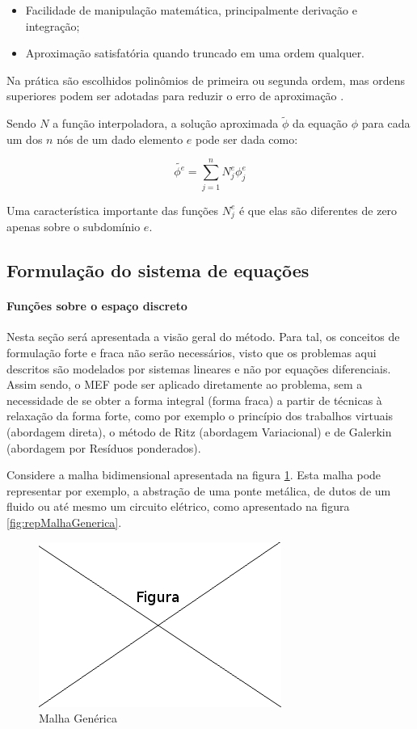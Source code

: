 \begin{itemize}  
\item Facilidade de manipulação matemática, principalmente derivação e integração;
\item Aproximação satisfatória quando truncado em uma ordem qualquer.
\end{itemize}

Na prática são escolhidos polinômios de primeira ou segunda ordem, mas ordens superiores podem ser adotadas para reduzir o erro de aproximação \citep[p. 32]{jin}.

Sendo $N$ a função interpoladora, a solução aproximada $\tilde{\phi}$ da equação $\phi$ para cada um dos $n$ nós de um dado elemento $e$ pode ser dada como:

 \begin{equation}
 	\label{eq:interpol}
		\tilde{\phi^e} = \sum_{j=1}^{n}{N_j^e \phi_j^e}
 \end{equation}

Uma característica importante das funções $N_j^e$ é que elas são diferentes de zero apenas sobre o subdomínio $e$.


\subsection{Formulação do sistema de equações}

\paragraph{Funções sobre o espaço discreto \\}

Nesta seção será apresentada a visão geral do método. Para tal, os conceitos de formulação forte e fraca não serão necessários, visto que os problemas aqui descritos são modelados por sistemas lineares e não por equações diferenciais. Assim sendo, o MEF pode ser aplicado diretamente ao problema, sem a necessidade de se obter a forma integral (forma fraca) a partir de técnicas à relaxação da forma forte, como por exemplo o princípio dos trabalhos virtuais (abordagem direta), o método de Ritz (abordagem Variacional) e de Galerkin (abordagem por Resíduos ponderados).

Considere a malha bidimensional  apresentada na figura \ref{fig:malhaGenerica}. Esta malha pode representar por exemplo, a abstração de uma ponte metálica, de dutos de um fluido ou até mesmo um circuito elétrico, como apresentado na figura \ref{fig:repMalhaGenerica}.
\begin{figure}[!htb]
\centering
\includegraphics[scale=0.5]{figuras/temp.png}
\caption{Malha Genérica}
\label{fig:malhaGenerica}
\end{figure}

